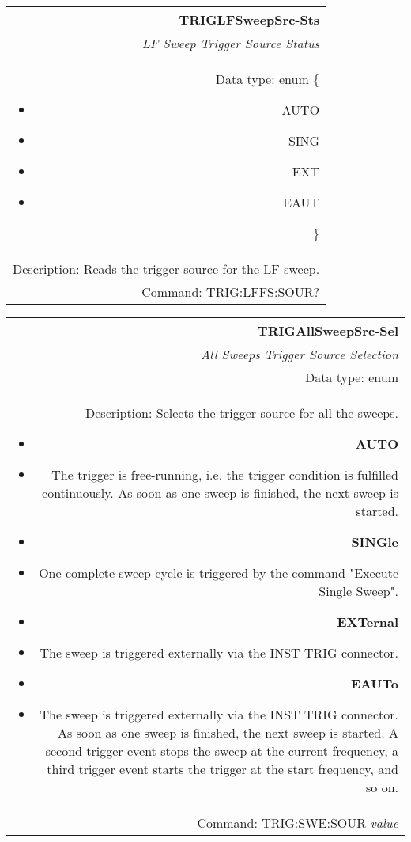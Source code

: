 \documentclass[openany]{article}
\begin{document}
		\begin{tabular}{N}
			\hline
			\bfseries TRIGLFSweepSrc-Sts \\ \hline
			\emph{LF Sweep Trigger Source Status} \\
			Data type: enum \{\begin{itemize}[noitemsep]
				\small
				\item[] AUTO
				\item[] SING
				\item[] EXT
				\item[] EAUT
			\end{itemize}\} \\ 
			Description: Reads the trigger source for the LF sweep. \\
			Command: TRIG:LFFS:SOUR? \\

		\end{tabular}
%
		\begin{tabular}{N}
			\hline
			\bfseries TRIGAllSweepSrc-Sel \\ \hline
			\emph{All Sweeps Trigger Source Selection} \\
			Data type: enum \\   
			Description: Selects the trigger source for all the sweeps.\begin{itemize}[noitemsep]
				\small
				\item[] \textbf{AUTO}
				\item[] The trigger is free-running, i.e. the trigger condition is fulfilled continuously. As soon as one sweep is finished, the next sweep is started.
                                \item[] \textbf{SINGle}
				\item[] One complete sweep cycle is triggered by the command "Execute Single Sweep".
				\item[] \textbf{EXTernal}
				\item[] The sweep is triggered externally via the INST TRIG connector.
                                \item[] \textbf{EAUTo}
				\item[] The sweep is triggered externally via the INST TRIG connector. As soon as one sweep is finished, the next sweep is started. A second trigger event stops the sweep at the current frequency, a third trigger event starts the trigger at the start frequency, and so on.

			\end{itemize} \\
			Command: TRIG:SWE:SOUR \emph{value} \\

		\end{tabular}
\end{document}
